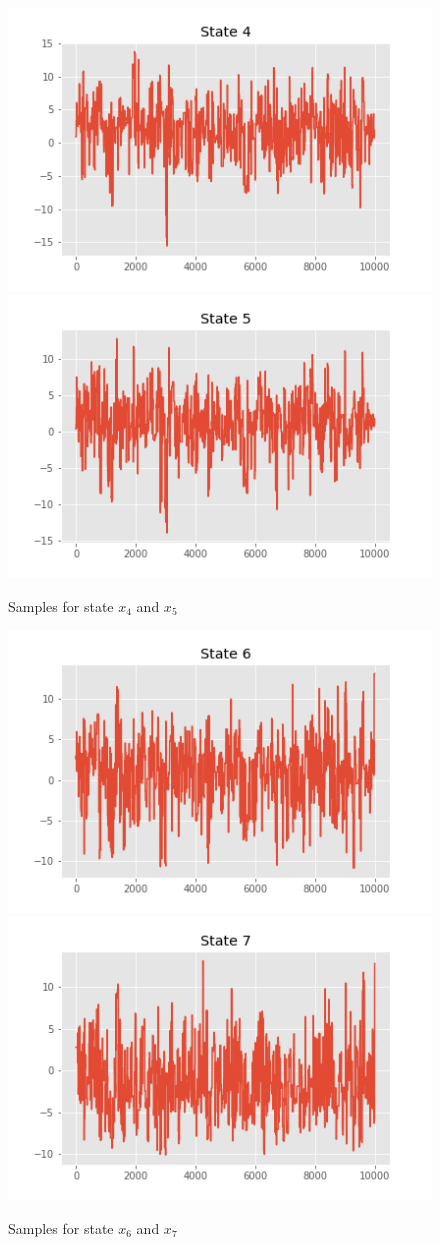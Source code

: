 \documentclass[]{article}
\begin{document}
\begin{figure}[H]
\begin{center}
		\includegraphics[width=.4\textwidth]{task2/figures/T_2_2/Q1/plt_x4.png}
		\includegraphics[width=.4\textwidth]{task2/figures/T_2_2/Q1/plt_x5.png}
		
		\caption*{Samples for state $x_4$ and $x_5$}
	\end{center}
\end{figure}

\begin{figure}[H]
\begin{center}
		\includegraphics[width=.4\textwidth]{task2/figures/T_2_2/Q1/plt_x6.png}
		\includegraphics[width=.4\textwidth]{task2/figures/T_2_2/Q1/plt_x7.png}
		
		\caption*{Samples for state $x_6$ and $x_7$}
	\end{center}
\end{figure}
\end{document}
